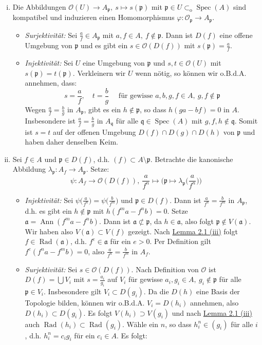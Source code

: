 \begin{enumerate}[(i)]
\item Die Abbildungen $\mathcal{O}(U)\to A_\mathfrak{p},\ s\mapsto s(\mathfrak{p})$ mit $\mathfrak{p}\in U\subset_\text{o}\operatorname{Spec}(A)$ sind kompatibel und induzieren einen Homomorphismus $\varphi:\mathcal{O}_\mathfrak{p}\to A_\mathfrak{p}$.
\begin{itemize}
\item \textit{Surjektivität:} Sei $\frac{a}{f}\in A_\mathfrak{p}$ mit $a,f\in A,\ f\not\in\mathfrak{p}$. Dann ist $D(f)$ eine offene Umgebung von $\mathfrak{p}$ und es gibt ein $s\in\mathcal{O}(D(f))$ mit $s(\mathfrak{p})=\frac{a}{f}$.
\item \textit{Injektivität:} Sei $U$ eine Umgebung von $\mathfrak{p}$ und $s,t\in\mathcal{O}(U)$ mit $s(\mathfrak{p})=t(\mathfrak{p})$. Verkleinern wir $U$ wenn nötig, so können wir o.B.d.A. annehmen, dass:
\[s=\frac{a}{f},\quad t=\frac{b}{g}\quad \text{ für gewisse } a,b,g,f\in A,\ g,f\not\in\mathfrak{p} \]
Wegen $\frac{a}{f}=\frac{b}{g}$ in $A_\mathfrak{p}$, gibt es ein $h\not\in\mathfrak{p}$, so dass $h(ga-bf)=0$ in $A$. Insbesondere ist $\frac{a}{f}=\frac{b}{g}$ in $A_\mathfrak{q}$ für alle $\mathfrak{q}\in\operatorname{Spec}(A)$ mit $g,f,h\not\in\mathfrak{q}$. Somit ist $s=t$ auf der offenen Umgebung $D(f)\cap D(g)\cap D(h)$ von $\mathfrak{p}$ und haben daher denselben Keim.
\end{itemize}
\item Sei $f\in A$ und $\mathfrak{p}\in D(f)$, d.h. $(f)\subset A\setminus\mathfrak{p}$. Betrachte die kanonische Abbildung $\lambda_\mathfrak{p}:A_f\to A_\mathfrak{p}$. Setze:
\[\psi: A_f \to\mathcal{O}(D(f)),\ \frac{a}{f^n}\mapsto \Big(\mathfrak{p}\mapsto \lambda_\mathfrak{p}\Big(\frac{a}{f^n}\Big)\Big) \]
\begin{itemize}
\item \textit{Injektivität:} Sei $\psi\big(\frac{a}{f^n}\big)=\psi \big(\frac{b}{f^m}\big)$ und $\mathfrak{p}\in D(f)$. Dann ist $\frac{a}{f^n}=\frac{b}{f^m}$ in $A_\mathfrak{p}$, d.h. es gibt ein $h\not\in\mathfrak{p}$ mit $h(f^ma-f^nb)=0$. Setze $\mathfrak{a}=\operatorname{Ann}(f^ma-f^nb)$. Dann ist $\mathfrak{a}\not\subset\mathfrak{p}$, da $h\in\mathfrak{a}$, also folgt $\mathfrak{p}\not\in V(\mathfrak{a})$. Wir haben also $V(\mathfrak{a})\subset V(f)$ gezeigt. Nach \hyperref[2.1]{Lemma 2.1 (iii)} folgt $f\in\operatorname{Rad}(\mathfrak{a})$, d.h. $f^e\in\mathfrak{a}$ für ein $e>0$. Per Definition gilt $f^e(f^na-f^mb)=0$, also $\frac{a}{f^n}=\frac{b}{f^m}$ in $A_f$.
\item \textit{Surjektivität:} Sei $s\in\mathcal{O}(D(f))$. Nach Definition von $\mathcal{O}$ ist $D(f)=\bigcup V_i$ mit $s=\frac{a_i}{g_i}$ auf $V_i$ für gewisse $a_i,g_i\in A,\ g_i\not\in\mathfrak{p}$ für alle $\mathfrak{p}\in V_i$. Insbesondere gilt $V_i\subset D(g_i)$. Da die $D(h)$ eine Basis der Topologie bilden, können wir o.B.d.A. $V_i=D(h_i)$ annehmen, also $D(h_i)\subset D(g_i)$. Es folgt $V(h_i)\supset V(g_i)$ und nach \hyperref[2.1]{Lemma 2.1 (iii)} auch $\operatorname{Rad}(h_i)\subset\operatorname{Rad}(g_i)$. Wähle ein $n$, so dass $h_i^n\in (g_i)$ für alle $i$, d.h. $h_i^n=c_ig_i$ für ein $c_i\in A$. Es folgt:

\end{itemize}
\end{enumerate}
